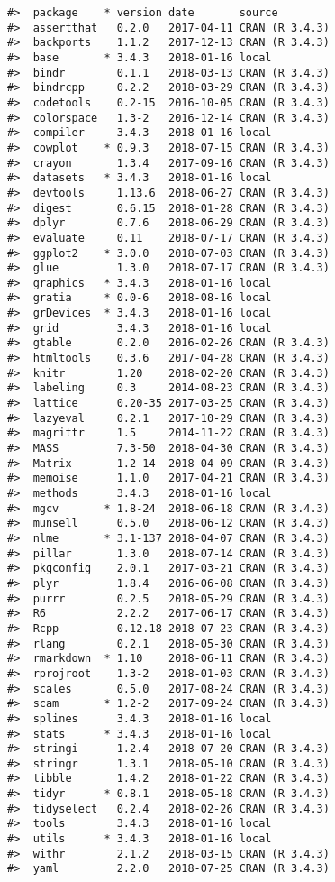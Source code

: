 \documentclass[12pt,]{article}
\begin{document}
\begin{verbatim}
#>  package    * version date       source        
#>  assertthat   0.2.0   2017-04-11 CRAN (R 3.4.3)
#>  backports    1.1.2   2017-12-13 CRAN (R 3.4.3)
#>  base       * 3.4.3   2018-01-16 local         
#>  bindr        0.1.1   2018-03-13 CRAN (R 3.4.3)
#>  bindrcpp     0.2.2   2018-03-29 CRAN (R 3.4.3)
#>  codetools    0.2-15  2016-10-05 CRAN (R 3.4.3)
#>  colorspace   1.3-2   2016-12-14 CRAN (R 3.4.3)
#>  compiler     3.4.3   2018-01-16 local         
#>  cowplot    * 0.9.3   2018-07-15 CRAN (R 3.4.3)
#>  crayon       1.3.4   2017-09-16 CRAN (R 3.4.3)
#>  datasets   * 3.4.3   2018-01-16 local         
#>  devtools     1.13.6  2018-06-27 CRAN (R 3.4.3)
#>  digest       0.6.15  2018-01-28 CRAN (R 3.4.3)
#>  dplyr        0.7.6   2018-06-29 CRAN (R 3.4.3)
#>  evaluate     0.11    2018-07-17 CRAN (R 3.4.3)
#>  ggplot2    * 3.0.0   2018-07-03 CRAN (R 3.4.3)
#>  glue         1.3.0   2018-07-17 CRAN (R 3.4.3)
#>  graphics   * 3.4.3   2018-01-16 local         
#>  gratia     * 0.0-6   2018-08-16 local         
#>  grDevices  * 3.4.3   2018-01-16 local         
#>  grid         3.4.3   2018-01-16 local         
#>  gtable       0.2.0   2016-02-26 CRAN (R 3.4.3)
#>  htmltools    0.3.6   2017-04-28 CRAN (R 3.4.3)
#>  knitr        1.20    2018-02-20 CRAN (R 3.4.3)
#>  labeling     0.3     2014-08-23 CRAN (R 3.4.3)
#>  lattice      0.20-35 2017-03-25 CRAN (R 3.4.3)
#>  lazyeval     0.2.1   2017-10-29 CRAN (R 3.4.3)
#>  magrittr     1.5     2014-11-22 CRAN (R 3.4.3)
#>  MASS         7.3-50  2018-04-30 CRAN (R 3.4.3)
#>  Matrix       1.2-14  2018-04-09 CRAN (R 3.4.3)
#>  memoise      1.1.0   2017-04-21 CRAN (R 3.4.3)
#>  methods      3.4.3   2018-01-16 local         
#>  mgcv       * 1.8-24  2018-06-18 CRAN (R 3.4.3)
#>  munsell      0.5.0   2018-06-12 CRAN (R 3.4.3)
#>  nlme       * 3.1-137 2018-04-07 CRAN (R 3.4.3)
#>  pillar       1.3.0   2018-07-14 CRAN (R 3.4.3)
#>  pkgconfig    2.0.1   2017-03-21 CRAN (R 3.4.3)
#>  plyr         1.8.4   2016-06-08 CRAN (R 3.4.3)
#>  purrr        0.2.5   2018-05-29 CRAN (R 3.4.3)
#>  R6           2.2.2   2017-06-17 CRAN (R 3.4.3)
#>  Rcpp         0.12.18 2018-07-23 CRAN (R 3.4.3)
#>  rlang        0.2.1   2018-05-30 CRAN (R 3.4.3)
#>  rmarkdown  * 1.10    2018-06-11 CRAN (R 3.4.3)
#>  rprojroot    1.3-2   2018-01-03 CRAN (R 3.4.3)
#>  scales       0.5.0   2017-08-24 CRAN (R 3.4.3)
#>  scam       * 1.2-2   2017-09-24 CRAN (R 3.4.3)
#>  splines      3.4.3   2018-01-16 local         
#>  stats      * 3.4.3   2018-01-16 local         
#>  stringi      1.2.4   2018-07-20 CRAN (R 3.4.3)
#>  stringr      1.3.1   2018-05-10 CRAN (R 3.4.3)
#>  tibble       1.4.2   2018-01-22 CRAN (R 3.4.3)
#>  tidyr      * 0.8.1   2018-05-18 CRAN (R 3.4.3)
#>  tidyselect   0.2.4   2018-02-26 CRAN (R 3.4.3)
#>  tools        3.4.3   2018-01-16 local         
#>  utils      * 3.4.3   2018-01-16 local         
#>  withr        2.1.2   2018-03-15 CRAN (R 3.4.3)
#>  yaml         2.2.0   2018-07-25 CRAN (R 3.4.3)
\end{verbatim}
\end{document}
